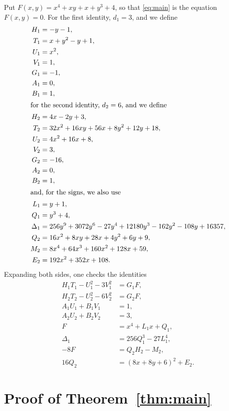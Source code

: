 \documentclass[11pt]{article}
\begin{document}
Put $F(x,y)=x^{4}+xy+x+y^{3}+4$, so that \eqref{eq:main} is the equation $F(x,y)=0$.
For the first identity, $d_{1}=3$, and we define
\begin{align*}
H_{1}&=-y-1,\\
T_{1}&=x+y^{2}-y+1,\\
U_{1}&=x^{2},\\
V_{1}&=1,\\
G_{1}&=-1,\\
A_{1}&=0,\\
B_{1}&=1,\\
\intertext{for the second identity, $d_{2}=6$, and we define}
H_{2}&=4x-2y+3,\\
T_{2}&=32x^{2}+16xy+56x+8y^{2}+12y+18,\\
U_{2}&=4x^{2}+16x+8,\\
V_{2}&=3,\\
G_{2}&=-16,\\
A_{2}&=0,\\
B_{2}&=1,\\
\intertext{and, for the signs, we also use}
L_{1}&=y+1,\\
Q_{1}&=y^{3}+4,\\
\Delta_{1}&=256y^{9}+3072y^{6}-27y^{4}+12180y^{3}-162y^{2}-108y+16357,\\
Q_{2}&=16x^{2}+8xy+28x+4y^{2}+6y+9,\\
M_{2}&=8x^{4}+64x^{3}+160x^{2}+128x+59,\\
E_{2}&=192x^{2}+352x+108.
\end{align*}
Expanding both sides, one checks the identities
\begin{align}
H_{1}T_{1}-U_{1}^2-3V_{1}^2&=G_{1}F,\label{eq:norm1}\\
H_{2}T_{2}-U_{2}^2-6V_{2}^2&=G_{2}F,\label{eq:norm2}\\
A_{1}U_{1}+B_{1}V_{1}&=1,\label{eq:bez1}\\
A_{2}U_{2}+B_{2}V_{2}&=3,\label{eq:bez2}\\
F&=x^4+L_{1}x+Q_{1},\label{eq:sign1}\\
\Delta_{1}&=256Q_{1}^3-27L_{1}^4,\label{eq:sign1b}\\
-8F&=Q_{2}H_{2}-M_{2},\label{eq:sign2}\\
16Q_{2}&=(8x+8y+6)^2+E_{2}.\label{eq:sign2b}
\end{align}

\section{Proof of Theorem~\ref{thm:main}}
\end{document}
